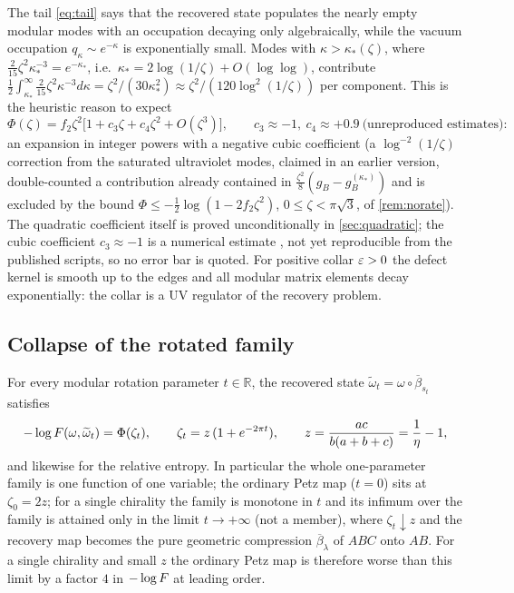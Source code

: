 The tail \eqref{eq:tail} says that the recovered state populates the nearly empty
modular modes with an occupation decaying only algebraically, while the vacuum
occupation $q_\kappa\sim e^{-\kappa}$ is exponentially small.  Modes with
$\kappa>\kappa_*(\zeta)$, where $\frac2{15}\zeta^2\kappa_*^{-3}=e^{-\kappa_*}$,
i.e.\ $\kappa_*=2\log(1/\zeta)+O(\log\log)$, contribute
$\frac12\int_{\kappa_*}^\infty\frac2{15}\zeta^2\kappa^{-3}d\kappa
=\zeta^2/(30\kappa_*^2)\approx\zeta^2/(120\log^2(1/\zeta))$ per component.  This is
the heuristic reason to expect
\begin{equation}\label{eq:expansion-structure}
 \Phi(\zeta)=f_2\zeta^2\bigl[1+c_3\zeta+c_4\zeta^2+O(\zeta^3)\bigr],\qquad c_3\approx-1,\ c_4\approx+0.9\ \text{(unreproduced estimates)}:
\end{equation}
an expansion in integer powers with a negative cubic coefficient (a $\log^{-2}(1/\zeta)$ correction from the saturated ultraviolet modes, claimed in an earlier version, double-counted a contribution already contained in $\tfrac{\zeta^2}{8}(g_B-g_B^{(\kappa_*)})$ and is excluded by the bound $\Phi\le-\tfrac12\log(1-2f_2\zeta^2)$, $0\le\zeta<\pi\sqrt3$, of \cref{rem:norate}).  The quadratic coefficient itself is proved unconditionally in
\cref{sec:quadratic}; the cubic coefficient $c_3\approx-1$ is a numerical estimate \cite{RigorRR}, not yet reproducible from the published scripts, so no error bar is quoted.  For positive collar
$\varepsilon>0$ the defect kernel is smooth up to the edges and all modular matrix
elements decay exponentially: the collar is a UV regulator of the recovery
problem.

\subsection{Collapse of the rotated family}

\begin{corollary}\label{cor:collapse}
For every modular rotation parameter $t\in\mathbb R$, the recovered state
$\widetilde\omega_t=\omega\circ\overline\beta_{s_t}$ satisfies
\begin{equation}\label{eq:collapse}
 -\log F(\omega,\widetilde\omega_t)=\Phi(\zeta_t),\qquad
 \zeta_t=z\,(1+e^{-2\pi t}),\qquad z=\frac{ac}{b(a+b+c)}=\frac1\eta-1,
\end{equation}
and likewise for the relative entropy.  In particular the whole one-parameter
family is one function of one variable; the ordinary Petz map ($t=0$) sits at
$\zeta_0=2z$; for a single chirality the family is monotone in $t$ and its infimum
over the family is attained only in the limit $t\to+\infty$ (not a member), where $\zeta_t\downarrow z$ and the recovery
map becomes the pure geometric compression $\overline\beta_\lambda$ of $ABC$ onto
$AB$.  For a single chirality and small $z$ the ordinary Petz map is therefore
worse than this limit by a factor $4$ in $-\log F$ at leading order.
\end{corollary}

